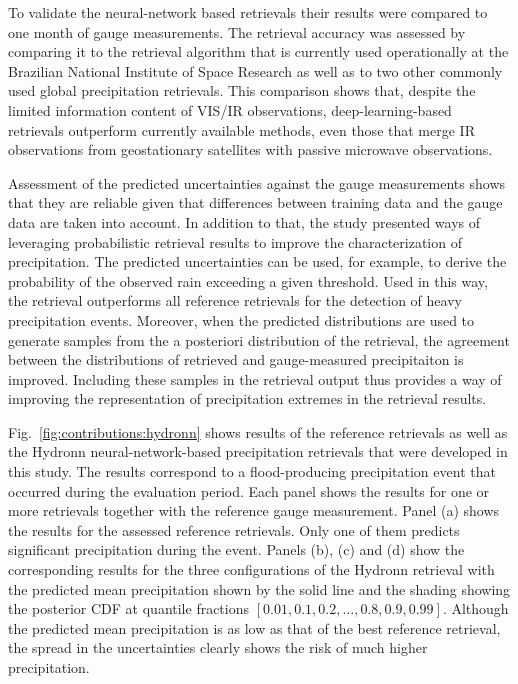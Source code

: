 
To validate the neural-network based retrievals their results were compared to
one month of gauge measurements. The retrieval accuracy was assessed by
comparing it to the retrieval algorithm that is currently used operationally at
the Brazilian National Institute of Space Research as well as to two other
commonly used global precipitation retrievals. This comparison shows that,
despite the limited information content of VIS/IR observations,
deep-learning-based retrievals outperform currently available methods, even
those that merge IR observations from geostationary satellites with passive
microwave observations.

Assessment of the predicted uncertainties against the gauge measurements shows
that they are reliable given that differences between training data and the
gauge data are taken into account. In addition to that, the study presented ways
of leveraging probabilistic retrieval results to improve the characterization of
precipitation. The predicted uncertainties can be used, for example, to derive
the probability of the observed rain exceeding a given threshold. Used in this
way, the retrieval outperforms all reference retrievals for the detection of
heavy precipitation events. Moreover, when the predicted distributions are used
to generate samples from the a posteriori distribution of the retrieval, the
agreement between the distributions of retrieved and gauge-measured
precipitaiton is improved. Including these samples in the retrieval output thus
provides a way of improving the representation of precipitation extremes in the
retrieval results.

Fig.~\ref{fig:contributions:hydronn} shows results of the reference retrievals
as well as the Hydronn neural-network-based precipitation retrievals that were
developed in this study. The results correspond to a flood-producing
precipitation event that occurred during the evaluation period. Each panel shows
the results for one or more retrievals together with the reference gauge
measurement. Panel (a) shows the results for the assessed reference retrievals.
Only one of them predicts significant precipitation during the event. Panels
(b), (c) and (d) show the corresponding results for the three configurations of
the Hydronn retrieval with the predicted mean precipitation shown by the solid
line and the shading showing the posterior CDF at quantile fractions $[0.01,
  0.1, 0.2, \ldots, 0.8, 0.9, 0.99]$. Although the predicted mean precipitation
is as low as that of the best reference retrieval, the spread in the
uncertainties clearly shows the risk of much higher precipitation.

